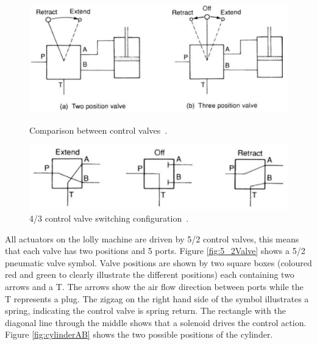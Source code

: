     \begin{figure}[H]
    \centering
    \begin{minipage}{0.45\textwidth}
        \centering
        \includegraphics[width = 1\textwidth]{2_images/controlValves.png}
        \caption{Comparison between control valves~\cite{parr2011hydraulics}.}
        \label{fig:controlValves}
    \end{minipage}\hfill
    \begin{minipage}{0.5\textwidth}
        \centering
        \includegraphics[width = 1\textwidth]{2_images/controlValveConfig.png}
        \caption{4/3 control valve switching configuration~\cite{parr2011hydraulics}.}
        \label{fig:controlValveConfig}
    \end{minipage}\hfill            
    \end{figure}      

    All actuators on the lolly machine are driven by 5/2 control valves, this means that each valve has two positions and 5 ports. Figure \ref{fig:5_2Valve} shows a 5/2 pneumatic valve symbol. Valve positions are shown by two square boxes (coloured red and green to clearly illustrate the different positions) each containing two arrows and a T. The arrows show the air flow direction between ports while the T represents a plug. The zigzag on the right hand side of the symbol illustrates a spring, indicating the control valve is spring return. The rectangle with the diagonal line through the middle shows that a solenoid drives the control action. Figure \ref{fig:cylinderAB} shows the two possible positions of the cylinder.

